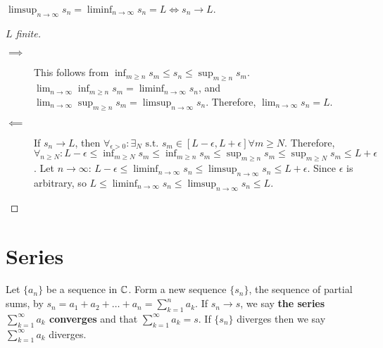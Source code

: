 \begin{lemma}
	$\limsup_{n\to \infty}{s_{n}}= \liminf_{n\to \infty}{s_{n}}=L \Leftrightarrow s_{n}\to L$.
	\begin{proof}[$L$ finite]\hfill
		\begin{description}
			\item[$\implies $] This follows from $\inf_{m\ge n}{s_m}\le s_{n}\le \sup_{m\ge n}{s_m}$. $\lim_{n\to \infty}{\inf_{m\ge n}{s_m}}=\liminf_{n\to \infty}{s_{n}}$, and $\lim_{n\to \infty}{\sup_{m\ge n}{s_m}}=\limsup_{n\to \infty}{s_{n}}$.
			      Therefore, $\lim_{n\to \infty}{s_{n}}=L$.
			\item[$\impliedby$]
			      If $s_{n}\to L$, then $\forall_{\epsilon > 0}: \exists_{N} \text{ s.t. } s_{m} \in [L-\epsilon,L+\epsilon] \forall m\ge N $.
			      Therefore, $\forall_{n \ge  N}: L-\epsilon\le \inf_{m\ge N}s_m\le \inf_{m\ge n}s_m \le \sup_{m\ge n}s_m\le \sup_{m\ge N}s_m\le L+\epsilon$.
			      Let $n\to \infty$: $L-\epsilon\le \liminf_{n\to \infty}{s_{n}}\le \limsup_{n\to \infty}{s_n}\le L+\epsilon$. Since $\epsilon$ is arbitrary, so $L\le \liminf_{n\to \infty}{s_{n}}\le \limsup_{n\to \infty}{s_{n}}\le L$.
		\end{description}
	\end{proof}
\end{lemma}


\section{Series}
\begin{definition}[Series]
	Let $\{a_{n}\}$ be a sequence in $\mathbb{C}$.
	Form a new sequence $\{ {s}_{n}\}$, the sequence of partial sums, by $s_{n}=a_1+a_2+\ldots +a_{n}=\sum_{k=1}^{n}{a_{k}}$. If $s_n \to s$, we say \textbf{ the series $\sum_{k=1}^{\infty }{a_{k}}$ converges} and that $\sum_{k=1}^{\infty }{a_{k}}=s$. If $\{ {s}_{n}\}$ diverges then we say $\sum_{k=1}^{\infty }{a_{k}}$ diverges.
\end{definition}

